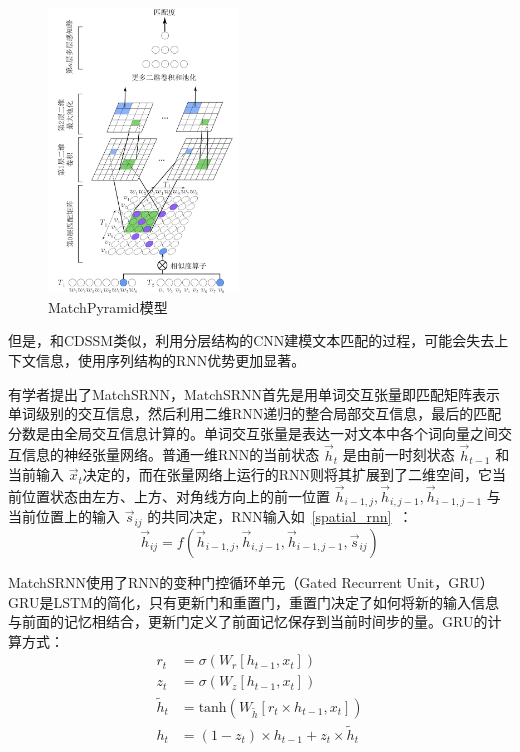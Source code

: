 \begin{figure}[!htbp]
\vspace{1em}
\centering
  \includegraphics[width=0.45\textwidth]{figures/MatchPyramid.jpg}
  \caption{MatchPyramid模型}
  \label{fig:MatchPyramid}       %
\vspace{1em}
\end{figure}



但是，和CDSSM类似，利用分层结构的CNN建模文本匹配的过程，可能会失去上下文信息，使用序列结构的RNN优势更加显著。

有学者提出了MatchSRNN\cite{Wan2016MatchSRNNMT}，MatchSRNN首先是用单词交互张量即匹配矩阵表示单词级别的交互信息，然后利用二维RNN\cite{Graves2007MultidimensionalRN}递归的整合局部交互信息，最后的匹配分数是由全局交互信息计算的。单词交互张量是表达一对文本中各个词向量之间交互信息的神经张量网络。普通一维RNN的当前状态 $\vec{h}_{t}$ 是由前一时刻状态 $\vec{h}_{t-1}$ 和当前输入 $\vec{x}_{t}$决定的，而在张量网络上运行的RNN则将其扩展到了二维空间，它当前位置状态由左方、上方、对角线方向上的前一位置 $\vec{h}_{i-1,j},\vec{h}_{i,j-1},\vec{h}_{i-1,j-1}$ 与当前位置上的输入 $\vec{s}_{ij}$ 的共同决定，RNN输入如~\eqref{spatial_rnn}~：
\begin{equation}
\label{spatial_rnn}
\vec{h}_{ij} = f(\vec{h}_{i-1,j},\vec{h}_{i,j-1},\vec{h}_{i-1,j-1},\vec{s}_{ij})
\end{equation}


MatchSRNN使用了RNN的变种门控循环单元\cite{Cho2014LearningPR}（Gated Recurrent Unit，GRU）GRU是LSTM的简化，只有更新门和重置门，重置门决定了如何将新的输入信息与前面的记忆相结合，更新门定义了前面记忆保存到当前时间步的量。GRU的计算方式：
\begin{equation}
\label{gru}
\begin{aligned}
r_t &= \sigma(W_r[h_{t-1},x_t])\\
z_t &= \sigma(W_z[h_{t-1},x_t])\\
\tilde{h}_t &= \text{tanh}(W_{\tilde{h}}[r_t \times h_{t-1},x_t]) \\
h_t &= (1-z_t)\times h_{t-1} + z_t\times\tilde{h}_t
\end{aligned}
\end{equation}

